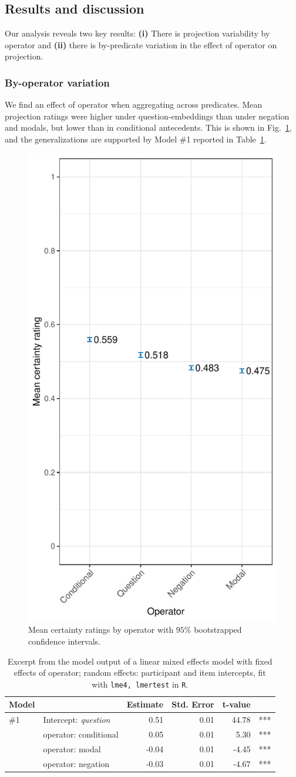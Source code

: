 \documentclass[a4paper,12pt,twoside]{article}
\begin{document}
	\subsection{Results and discussion}
		Our analysis reveals two key results: \textbf{(i)} There is projection variability by operator and \textbf{(ii)} there is by-predicate variation in the effect of operator on projection.

		\subsubsection{By-operator variation}

			We find an effect of operator when aggregating across predicates. Mean projection ratings were higher under question-embeddings than under negation and modals, but lower than in conditional antecedents. This is shown in Fig.~\ref{fig:op-ratings}, and the generalizations are supported by Model \#1 reported in Table~\ref{t:op-model}.

			\begin{figure}[ht]
				\centering
				\includegraphics[width = .35\linewidth]{projective-op}
				\caption{Mean certainty ratings by operator with $95\%$ bootstrapped confidence intervals.}
				\label{fig:op-ratings}
			\end{figure}

			\begin{table}[ht]
					\centering
					\hspace{-1.3em}
					\begin{tabular}{llrrrr}
						Model & & Estimate & Std. Error & t-value\\
						\midrule
						\#1 & Intercept: \emph{question} & 0.51 & 0.01 & 44.78 & ***\\
						& operator: conditional & 0.05 & 0.01 & 5.30 & ***\\
						& operator: modal & -0.04 & 0.01 & -4.45 & ***\\
						& operator: negation & -0.03 & 0.01 & -4.67 & ***\\
						\bottomrule
					\end{tabular}
				
					\caption{Excerpt from the model output of a linear mixed effects model with fixed effects of operator; random effects: participant and item intercepts, fit with \texttt{lme4, lmertest} in \texttt{R}.\label{t:op-model}}
				\end{table}
\end{document}
